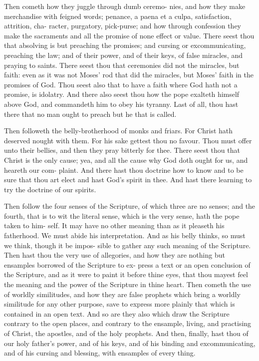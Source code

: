 \documentclass{custom}
\begin{document}
Then cometh how they juggle through dumb ceremo- 
nies, and how they make merchandise with feigned words; 
penance, a paena et a culpa, satisfaction, attrition, cha- 
racter, purgatory, pick-purse; and how through confession 
they make the sacraments and all the promise of none 
effect or value. There seest thou that absolving is but 
preaching the promises; and cursing or excommunicating, 
preaching the law; and of their power, and of their keys, 
of false miracles, and praying to saints. There seest thou 
that ceremonies did not the miracles, but faith: even as it 
was not Moses' rod that did the miracles, but Moses' 
faith in the promises of God. Thou seest also that to 
have a faith where God hath not a promise, is idolatry. 
And there also seest thou how the pope exalteth himself 
above God, and commandeth him to obey his tyranny. 
Last of all, thou hast there that no man ought to preach 
but he that is called. 

Then followeth the belly-brotherhood of monks and 
friars. For Christ hath deserved nought with them. For 
his sake gettest thou no favour. Thou must offer unto 
their bellies, and then they pray bitterly for thee. There 
seest thou that Christ is the only cause; yea, and all the 
cause why God doth ought for us, and heareth our com- 
plaint. And there hast thou doctrine how to know and 
to be sure that thou art elect and hast God's spirit in thee. 
And hast there learning to try the doctrine of our spirits. 

Then follow the four senses of the Scripture, of which 
three are no senses; and the fourth, that is to wit the literal 
sense, which is the very sense, hath the pope taken to him- 
self. It may have no other meaning than as it pleaseth 
his fatherhood. We must abide his interpretation. And 
as his belly thinks, so must we think, though it be impos- 
sible to gather any such meaning of the Scripture. Then 
hast thou the very use of allegories, and how they are 
nothing but ensamples borrowed of the Scripture to ex- 
press a text or an open conclusion of the Scripture, and as 
it were to paint it before thine eyes, that thou mayest feel 
the meaning and the power of the Scripture in thine heart. 
Then cometh the use of worldly similitudes, and how
they are false prophets which bring a worldly similitude 
for any other purpose, save to express more plainly that 
which is contained in an open text. And so are they also 
which draw the Scripture contrary to the open places, and 
contrary to the ensample, living, and practising of Christ, 
the apostles, and of the holy prophets. And then, finally, 
hast thou of our holy father's power, and of his keys, and 
of his binding and excommunicating, and of his cursing 
and blessing, with ensamples of every thing. 
\end{document}
